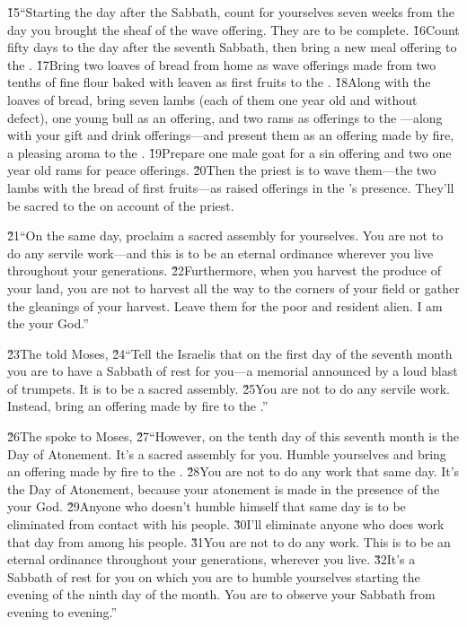 \v{15}``Starting the day after the Sabbath, count for yourselves seven weeks from the day you brought the sheaf of the wave offering. They are to be complete. \v{16}Count fifty days to the day after the seventh Sabbath, then bring a new meal offering to the . \v{17}Bring two loaves of bread from home as wave offerings made from two tenths of fine flour baked with leaven as first fruits to the . \v{18}Along with the loaves of bread, bring seven lambs (each of them one year old and without defect), one young bull as an offering, and two rams as offerings to the ---along with your gift and drink offerings---and present them as an offering made by fire, a pleasing aroma to the . \v{19}Prepare one male goat for a sin offering and two one year old rams for peace offerings. \v{20}Then the priest is to wave them---the two lambs with the bread of first fruits---as raised offerings in the 's presence. They'll be sacred to the  on account of the priest.

\v{21}``On the same day, proclaim a sacred assembly for yourselves. You are not to do any servile work---and this is to be an eternal ordinance wherever you live throughout your generations. \v{22}Furthermore, when you harvest the produce of your land, you are not to harvest all the way to the corners of your field or gather the gleanings of your harvest. Leave them for the poor and resident alien. I am the  your God.''

\v{23}The  told Moses, \v{24}``Tell the Israelis that on the first day of the seventh month you are to have a Sabbath of rest for you---a memorial announced by a loud blast of trumpets. It is to be a sacred assembly. \v{25}You are not to do any servile work. Instead, bring an offering made by fire to the .''

\v{26}The  spoke to Moses, \v{27}``However, on the tenth day of this seventh month is the Day of Atonement. It's a sacred assembly for you. Humble yourselves and bring an offering made by fire to the . \v{28}You are not to do any work that same day. It's the Day of Atonement, because your atonement is made in the presence of the  your God. \v{29}Anyone who doesn't humble himself that same day is to be eliminated from contact with his people. \v{30}I'll eliminate anyone who does work that day from among his people. \v{31}You are not to do any work. This is to be an eternal ordinance throughout your generations, wherever you live. \v{32}It's a Sabbath of rest for you on which you are to humble yourselves starting the evening of the ninth day of the month. You are to observe your Sabbath from evening to evening.''

